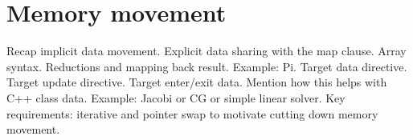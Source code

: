 

\chapter{Memory movement}
Recap implicit data movement.
Explicit data sharing with the map clause.
Array syntax.
Reductions and mapping back result.
Example: Pi.
Target data directive.
Target update directive.
Target enter/exit data.
Mention how this helps with C++ class data.
Example: Jacobi or CG or simple linear solver. Key requirements: iterative and pointer swap to motivate cutting down memory movement.

